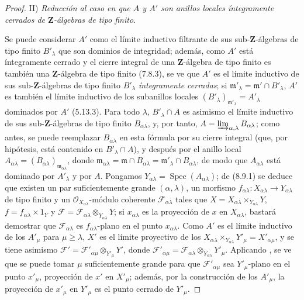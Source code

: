 \begin{proof}
\medskip
\noindent II) \emph{Reducción al caso en que $A$ y $A'$ son anillos locales íntegramente cerrados de $\mathbf Z$-álgebras de tipo
finito.}

\medskip
Se puede considerar $A'$ como el límite inductivo filtrante de sus sub-$\mathbf Z$-álgebras de tipo finito
$B'_{\lambda}$ que son dominios de integridad; además, como $A'$ está íntegramente cerrado y el cierre
integral de una $\mathbf Z$-álgebra de tipo finito es también una $\mathbf Z$-álgebra de tipo finito (7.8.3), se
ve que $A'$ es el límite inductivo de sus sub-$\mathbf Z$-álgebras de tipo finito $B'_{\lambda}$ \emph{íntegramente cerradas};
si $\mathfrak m'_{\lambda}=\mathfrak m'\cap B'_{\lambda}$, $A'$ es también el límite inductivo de los subanillos locales $(B'_{\lambda})_{\mathfrak m'_{\lambda}}=A'_{\lambda}$
dominados por $A'$ (5.13.3). Para todo $\lambda$, $B'_{\lambda}\cap A$ es asimismo el límite inductivo de sus
sub-$\mathbf Z$-álgebras de tipo finito $B_{\alpha\lambda}$, y, por tanto, $A=\varinjlim_{\alpha,\lambda}B_{\alpha\lambda}$; como antes, se puede reemplazar $B_{\alpha\lambda}$
en esta fórmula por su cierre integral (que, por hipótesis, está contenido en $B'_{\lambda}\cap A$), y después por el anillo local
$A_{\alpha\lambda}=(B_{\alpha\lambda})_{\mathfrak m_{\alpha\lambda}}$, donde
$\mathfrak m_{\alpha\lambda}=\mathfrak m\cap B_{\alpha\lambda}
=\mathfrak m'_{\lambda}\cap B_{\alpha\lambda}$, de modo que $A_{\alpha\lambda}$ está dominado por $A'_{\lambda}$ y por $A$.
Pongamos $Y_{\alpha\lambda}=\operatorname{Spec}(A_{\alpha\lambda})$; de (8.9.1) se deduce que existen un par suficientemente grande
$(\alpha,\lambda)$, un morfismo $f_{\alpha\lambda}:X_{\alpha\lambda}\to Y_{\alpha\lambda}$ de tipo finito y un
$\mathcal O_{X_{\alpha\lambda}}$-módulo coherente $\mathcal F_{\alpha\lambda}$ tales que
$X=X_{\alpha\lambda}\times_{Y_{\alpha\lambda}}Y$,
$f=f_{\alpha\lambda}\times1_Y$ y $\mathcal F=\mathcal F_{\alpha\lambda}\otimes_{Y_{\alpha\lambda}}Y$; si $x_{\alpha\lambda}$
es la proyección de $x$ en $X_{\alpha\lambda}$, bastará demostrar que $\mathcal F_{\alpha\lambda}$ es $f_{\alpha\lambda}$-plano en el punto $x_{\alpha\lambda}$.
Como $A'$ es el límite inductivo de los $A'_{\mu}$ para $\mu\geq\lambda$, $X'$ es el límite proyectivo de los
$X_{\alpha\lambda}\times_{Y_{\alpha\lambda}}Y'_{\mu}=X'_{\alpha\mu}$, y se tiene asimismo
$\mathcal F'=\mathcal F'_{\alpha\mu}\otimes_{Y'_{\mu}}Y'$, donde
$\mathcal F'_{\alpha\mu}
=\mathcal F_{\alpha\lambda}\otimes_{Y_{\alpha\lambda}}Y'_{\mu}$. Aplicando
, se ve que se puede tomar $\mu$ suficientemente grande para que $\mathcal F'_{\alpha\mu}$ sea $Y'_{\mu}$-plano en el
punto $x'_{\mu}$, proyección de $x'$ en $X'_{\mu}$; además, por la construcción de los $A'_{\mu}$, la proyección
de $x'_{\mu}$ en $Y'_{\mu}$ es el punto cerrado de $Y'_{\mu}$.


\end{proof}
